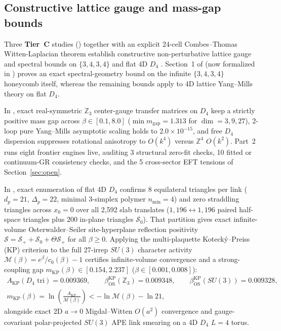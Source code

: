 \subsection{Constructive lattice gauge and mass-gap bounds}

Three \textbf{Tier~C} studies () together with an explicit 24-cell Combes--Thomas
Witten-Laplacian theorem establish constructive non-perturbative lattice gauge and spectral bounds on $\{3,4,3,4\}$
and flat 4D $D_4$ \cite{wilson1974, osterwalder1978, seiler1982, kotecky1986, callan1990, tomboulis1983, bakry1985,
helffer1994, combes1973, bodineau1999}. Section~1 of  (now formalized in )
proves an exact spectral-geometry bound on the infinite $\{3,4,3,4\}$ honeycomb itself, whereas the remaining bounds
apply to 4D lattice Yang--Mills theory on flat $D_4$.

In , exact real-symmetric $\mathbb{Z}_3$ center-gauge transfer matrices on $D_4$ keep a strictly
positive mass gap across $\beta \in [0.1, 8.0]$ ($\min m_{\mathrm{gap}} = 1.313$ for $\dim = 3, 9, 27$), 2-loop pure
Yang--Mills asymptotic scaling holds to $2.0 \times 10^{-15}$, and free $D_4$ dispersion suppresses rotational
anisotropy to $O(k^4)$ versus $\mathbb{Z}^4$ $O(k^2)$. Part~2 runs eight frontier engines live, auditing 3 structural
zero-fit checks, 10 fitted or continuum-GR consistency checks, and the 5 cross-sector EFT tensions of
Section~\ref{sec:open}.

In , exact  enumeration of flat 4D $D_4$ confirms 8 equilateral triangles per link
($d_p = 21$, $\Delta_p = 22$, minimal 3-simplex polymer $n_{\min} = 4$) and zero straddling triangles across $x_0 = 0$
over all 2,592 slab translates ($1{,}196 \leftrightarrow 1{,}196$ paired half-space triangles plus $200$ in-plane
triangles $\mathcal{S}_0$). That partition gives exact infinite-volume Osterwalder--Seiler site-hyperplane reflection
positivity $\mathcal{S} = \mathcal{S}_+ + \mathcal{S}_0 + \Theta \mathcal{S}_+$ for all $\beta \ge 0$. Applying the
multi-plaquette Koteck\'y--Preiss (KP) criterion \cite{kotecky1986} to the full 27-irrep $SU(3)$ character activity
$\mathcal{M}(\beta) = e^\beta / c_0(\beta) - 1$ certifies infinite-volume convergence and a strong-coupling gap
$m_{\mathrm{KP}}(\beta) \in [0.154, 2.237]$ ($\beta \in [0.001, 0.008]$):
\begin{gather}
A_{\mathrm{KP}}(D_4\text{ tri}) = 0.009369,
\qquad
\beta_{\mathrm{OS}}^{\mathrm{KP}}(\mathbb{Z}_3) = 0.009348,
\qquad
\beta_{\mathrm{OS}}^{\mathrm{KP}}(SU(3)) = 0.009328, \nonumber\\
m_{\mathrm{KP}}(\beta) = \ln\!\left(\frac{A_{\mathrm{KP}}}{\mathcal{M}(\beta)}\right)
< -\ln\mathcal{M}(\beta) - \ln 21,
\label{eq:os-radii}
\end{gather}
alongside exact 2D $a \to 0$ Migdal--Witten $O(a^2)$ convergence and gauge-covariant polar-projected $SU(3)$ APE link
smearing on a 4D $D_4$ $L = 4$ torus.

